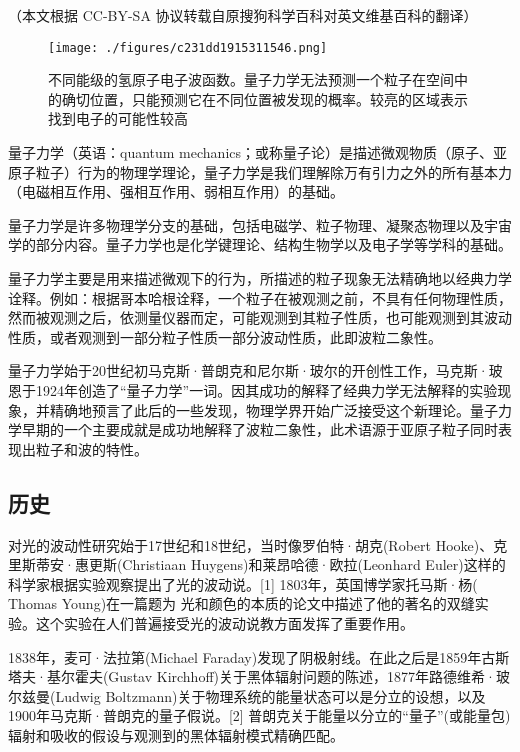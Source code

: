 
（本文根据 CC-BY-SA 协议转载自原搜狗科学百科对英文维基百科的翻译）

\begin{figure}[ht]
\centering
\texttt{[image: ./figures/c231dd1915311546.png]}
\caption{不同能级的氢原子电子波函数。量子力学无法预测一个粒子在空间中的确切位置，只能预测它在不同位置被发现的概率。较亮的区域表示找到电子的可能性较高} \label{fig_LZLX_11}
\end{figure}

量子力学（英语：quantum mechanics；或称量子论）是描述微观物质（原子、亚原子粒子）行为的物理学理论，量子力学是我们理解除万有引力之外的所有基本力（电磁相互作用、强相互作用、弱相互作用）的基础。

量子力学是许多物理学分支的基础，包括电磁学、粒子物理、凝聚态物理以及宇宙学的部分内容。量子力学也是化学键理论、结构生物学以及电子学等学科的基础。

量子力学主要是用来描述微观下的行为，所描述的粒子现象无法精确地以经典力学诠释。例如：根据哥本哈根诠释，一个粒子在被观测之前，不具有任何物理性质，然而被观测之后，依测量仪器而定，可能观测到其粒子性质，也可能观测到其波动性质，或者观测到一部分粒子性质一部分波动性质，此即波粒二象性。

量子力学始于20世纪初马克斯·普朗克和尼尔斯·玻尔的开创性工作，马克斯·玻恩于1924年创造了“量子力学”一词。因其成功的解释了经典力学无法解释的实验现象，并精确地预言了此后的一些发现，物理学界开始广泛接受这个新理论。量子力学早期的一个主要成就是成功地解释了波粒二象性，此术语源于亚原子粒子同时表现出粒子和波的特性。

\subsection{ 历史}

对光的波动性研究始于17世纪和18世纪，当时像罗伯特·胡克(Robert Hooke)、克里斯蒂安·惠更斯(Christiaan Huygens)和莱昂哈德·欧拉(Leonhard Euler)这样的科学家根据实验观察提出了光的波动说。[1] 1803年，英国博学家托马斯·杨( Thomas Young)在一篇题为 光和颜色的本质的论文中描述了他的著名的双缝实验。这个实验在人们普遍接受光的波动说教方面发挥了重要作用。

1838年，麦可·法拉第(Michael Faraday)发现了阴极射线。在此之后是1859年古斯塔夫·基尔霍夫(Gustav Kirchhoff)关于黑体辐射问题的陈述，1877年路德维希·玻尔兹曼(Ludwig Boltzmann)关于物理系统的能量状态可以是分立的设想，以及1900年马克斯·普朗克的量子假说。[2] 普朗克关于能量以分立的“量子”(或能量包)辐射和吸收的假设与观测到的黑体辐射模式精确匹配。

